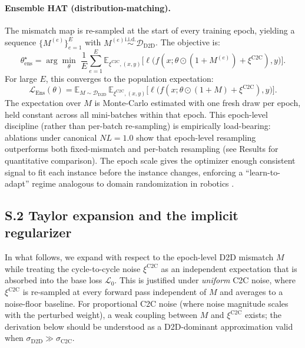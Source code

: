 \paragraph{Ensemble HAT (distribution-matching).} The mismatch map is re-sampled at the start of every training epoch, yielding a sequence $\{M^{(e)}\}_{e=1}^{E}$ with $M^{(e)} \stackrel{\text{i.i.d.}}{\sim} \mathcal{D}_{\text{D2D}}$. The objective is:
\begin{equation}
    \theta_{\text{ens}}^{\star} = \arg\min_{\theta} \; \frac{1}{E}\sum_{e=1}^{E} \mathbb{E}_{\xi^{\text{C2C}}, (x,y)} \bigl[ \ell\bigl(f(x; \theta \odot (1+M^{(e)}) + \xi^{\text{C2C}}), y\bigr) \bigr].
    \label{eq:ensemble-hat-objective}
\end{equation}
For large $E$, this converges to the population expectation:
\begin{equation}
    \mathcal{L}_{\text{Ens}}(\theta) = \mathbb{E}_{M \sim \mathcal{D}_{\text{D2D}}} \, \mathbb{E}_{\xi^{\text{C2C}}, (x,y)} \bigl[ \ell\bigl(f(x; \theta \odot (1+M) + \xi^{\text{C2C}}), y\bigr) \bigr].
    \label{eq:ensemble-population}
\end{equation}
The expectation over $M$ is Monte-Carlo estimated with one fresh draw per epoch, held constant across all mini-batches within that epoch. This epoch-level discipline (rather than per-batch re-sampling) is empirically load-bearing: ablations under canonical $NL=1.0$ show that epoch-level resampling outperforms both fixed-mismatch and per-batch resampling (see Results for quantitative comparison). The epoch scale gives the optimizer enough consistent signal to fit each instance before the instance changes, enforcing a ``learn-to-adapt'' regime analogous to domain randomization in robotics \citep{tobin2017domain}.

\subsection*{S.2 Taylor expansion and the implicit regularizer}

In what follows, we expand with respect to the epoch-level D2D mismatch $M$ while treating the cycle-to-cycle noise $\xi^{\text{C2C}}$ as an independent expectation that is absorbed into the base loss $\mathcal{L}_0$. This is justified under \emph{uniform} C2C noise, where $\xi^{\text{C2C}}$ is re-sampled at every forward pass independent of $M$ and averages to a noise-floor baseline. For proportional C2C noise (where noise magnitude scales with the perturbed weight), a weak coupling between $M$ and $\xi^{\text{C2C}}$ exists; the derivation below should be understood as a D2D-dominant approximation valid when $\sigma_{\text{D2D}} \gg \sigma_{\text{C2C}}$.

